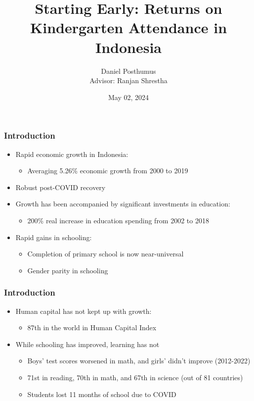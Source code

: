 \documentclass{beamer}
\title{Starting Early: Returns on Kindergarten Attendance in Indonesia}
\author{Daniel Posthumus \\ Advisor: Ranjan Shrestha}
\institute{Department of Economics \\ College of William and Mary}
\date{May 02, 2024}
\begin{document}
\frame{\titlepage}

\begin{frame}
\frametitle{Introduction}
\begin{itemize}
	\item Rapid economic growth in Indonesia:
	\begin{itemize} 
		\item Averaging 5.26\% economic growth from 2000 to 2019
	\end{itemize}
	\vspace{0.1in}
	\item Robust post-COVID recovery
	\vspace{0.1in}
	\item Growth has been accompanied by significant investments in education:
	\begin{itemize}
		\item 200\% real increase in education spending from 2002 to 2018 
	\end{itemize}
	\vspace{0.1in}
	\item Rapid gains in schooling:
	\begin{itemize}
		\item Completion of primary school is now near-universal
		\item Gender parity in schooling
	\end{itemize}
\end{itemize}
\end{frame}

\begin{frame}
\frametitle{Introduction}
\begin{itemize}
	\item Human capital has not kept up with growth:
	\begin{itemize}
		\item 87th in the world in Human Capital Index
	\end{itemize}
	\vspace{0.1in}
	\item While schooling has improved, learning has not
	\begin{itemize}
		\item Boys' test scores worsened in math, and girls' didn't improve (2012-2022)
		\item 71st in reading, 70th in math, and 67th in science (out of 81 countries)
		\item Students lost 11 months of school due to COVID
	\end{itemize}
\end{itemize}
\end{frame}
\end{document}
